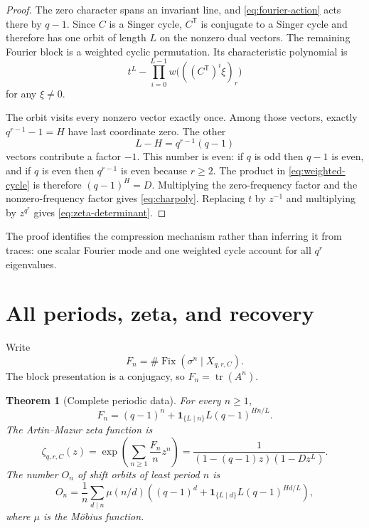 \documentclass[11pt,a4paper]{amsart}
\newtheorem{theorem}{Theorem}[section]
\theoremstyle{definition}
\theoremstyle{remark}
\newcommand{\Fix}{\operatorname{Fix}}
\newcommand{\tr}{\operatorname{tr}}
\newcommand{\one}{\mathbf 1}
\begin{document}
\begin{proof}
The zero character spans an invariant line, and
\eqref{eq:fourier-action} acts there by $q-1$.  Since $C$ is a Singer cycle,
$C^{\mathsf T}$ is conjugate to a Singer cycle and therefore has one orbit
of length $L$ on the nonzero dual vectors.  The remaining Fourier block is a
weighted cyclic permutation.  Its characteristic polynomial is
\begin{equation}\label{eq:weighted-cycle}
 t^L-\prod_{i=0}^{L-1}w\bigl(((C^{\mathsf T})^i\xi)_r\bigr)
\end{equation}
for any $\xi\ne0$.

The orbit visits every nonzero vector exactly once.  Among those vectors,
exactly $q^{r-1}-1=H$ have last coordinate zero.  The other
\[
 L-H=q^{r-1}(q-1)
\]
vectors contribute a factor $-1$.  This number is even: if $q$ is odd then
$q-1$ is even, and if $q$ is even then $q^{r-1}$ is even because $r\geq2$.
The product in \eqref{eq:weighted-cycle} is therefore $(q-1)^H=D$.
Multiplying the zero-frequency factor and the nonzero-frequency factor gives
\eqref{eq:charpoly}.  Replacing $t$ by $z^{-1}$ and multiplying by $z^{q^r}$
gives \eqref{eq:zeta-determinant}.
\end{proof}

The proof identifies the compression mechanism rather than inferring it
from traces: one scalar Fourier mode and one weighted cycle account for all
$q^r$ eigenvalues.

\section{All periods, zeta, and recovery}
\label{sec:periods}

Write
\[
 F_n=\#\Fix(\sigma^n\mid X_{q,r,C}).
\]
The block presentation is a conjugacy, so $F_n=\tr(A^n)$.

\begin{theorem}[Complete periodic data]
\label{thm:periodic}
For every $n\geq1$,
\begin{equation}\label{eq:fixed-count}
 \boxed{
 F_n=(q-1)^n+\one_{\{L\mid n\}}L(q-1)^{Hn/L}.}
\end{equation}
The Artin--Mazur zeta function is
\begin{equation}\label{eq:zeta}
 \boxed{
 \zeta_{q,r,C}(z)
 =\exp\!\left(\sum_{n\geq1}\frac{F_n}{n}z^n\right)
 =\frac{1}{(1-(q-1)z)(1-Dz^L)}.}
\end{equation}
The number $O_n$ of shift orbits of least period $n$ is
\begin{equation}\label{eq:least-period}
 O_n=\frac1n\sum_{d\mid n}\mu(n/d)
 \left((q-1)^d+\one_{\{L\mid d\}}L(q-1)^{Hd/L}\right),
\end{equation}
where $\mu$ is the M\"obius function.
\end{theorem}
\end{document}
